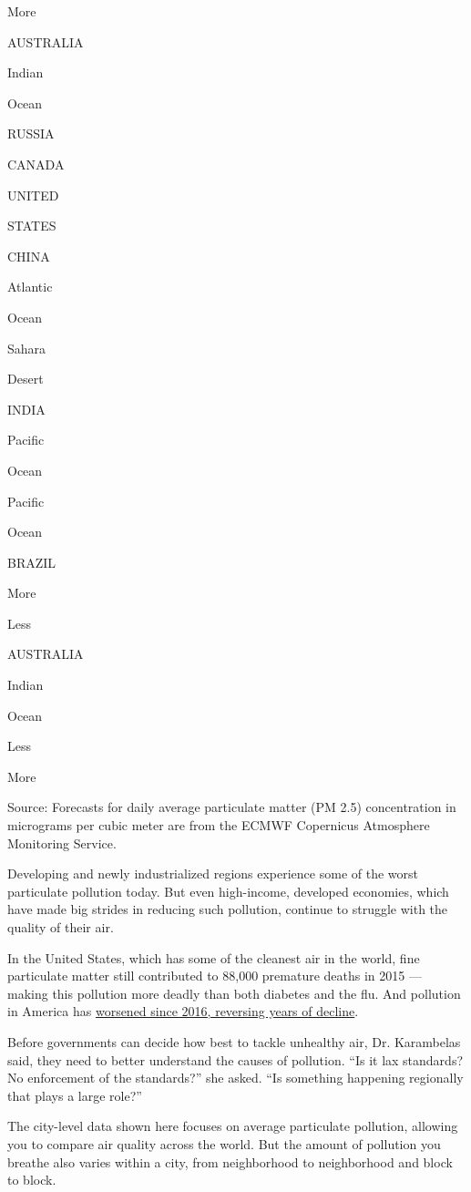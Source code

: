 More

AUSTRALIA

Indian

Ocean

RUSSIA

CANADA

UNITED

STATES

CHINA

Atlantic

Ocean

Sahara

Desert

INDIA

Pacific

Ocean

Pacific

Ocean

BRAZIL

More

Less

AUSTRALIA

Indian

Ocean

Less

More

Source: Forecasts for daily average particulate matter (PM 2.5)
concentration in micrograms per cubic meter are from the ECMWF
Copernicus Atmosphere Monitoring Service.

Developing and newly industrialized regions experience some of the worst
particulate pollution today. But even high-income, developed economies,
which have made big strides in reducing such pollution, continue to
struggle with the quality of their air.

In the United States, which has some of the cleanest air in the world,
fine particulate matter still contributed to 88,000 premature deaths in
2015 --- making this pollution more deadly than both diabetes and the
flu. And pollution in America has
\href{https://www.nytimes3xbfgragh.onion/interactive/2019/10/24/climate/air-pollution-increase.html}{worsened
since 2016, reversing years of decline}.

Before governments can decide how best to tackle unhealthy air, Dr.
Karambelas said, they need to better understand the causes of pollution.
``Is it lax standards? No enforcement of the standards?'' she asked.
``Is something happening regionally that plays a large role?''

The city-level data shown here focuses on average particulate pollution,
allowing you to compare air quality across the world. But the amount of
pollution you breathe also varies within a city, from neighborhood to
neighborhood and block to block.

